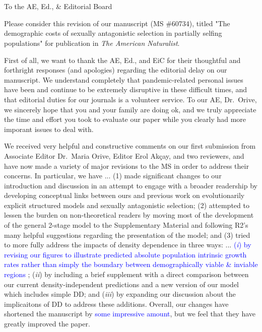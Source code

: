 \documentclass[11pt]{article}
\begin{document}




\section*{}
\noindent To the AE, Ed., \& Editorial Board
\bigskip

\noindent Please consider this revision of our manuscript (MS \#60734), titled "The demographic costs of sexually antagonistic selection in partially selfing populations" for publication in \textit{The American Naturalist}. 
\bigskip

\noindent First of all, we want to thank the AE, Ed., and EiC for their thoughtful and forthright responses (and apologies) regarding the editorial delay on our manuscript. We understand completely that pandemic-related personal issues have been and continue to be extremely disruptive in these difficult times, and that editorial duties for our journals is a volunteer service. To our AE, Dr.~Orive, we sincerely hope that you and your family are doing ok, and we truly appreciate the time and effort you took to evaluate our paper while you clearly had more imporant issues to deal with.
\bigskip

\noindent We received very helpful and constructive comments on our first submission from Associate Editor Dr.~Maria Orive, Editor Erol Ak\c{c}ay, and two reviewers, and have now made a variety of major revisions to the MS in order to address their concerns. In particular, we have ... (1) made significant changes to our introduction and discussion in an attempt to engage with a broader readership by developing conceptual links between ours and previous work on evolutionarily explicit structured models and sexually antagonistic selection; (2) attempted to lessen the burden on non-theoretical readers by moving most of the development of the general 2-stage model to the Supplementary Material and following R2's many helpful suggestions regarding the presentation of the model; and (3) tried to more fully address the impacts of density dependence in three ways:  ... \textcolor{blue}{({\itshape i}) by revising our figures to illustrate predicted absolute population intrinsic growth rates rather than simply the boundary between demographically viable \& inviable regions} ; ({\itshape ii}) by including a brief supplement with a direct comparison between our current density-independent predictions and a new version of our model which includes simple DD; and ({\itshape iii}) by expanding our discussion about the implicaitons of DD to address these additions. Overall, our changes have shortened the manuscript by \textcolor{blue}{some impressive amount}, but we feel that they have greatly improved the paper. 
\bigskip
\end{document}
